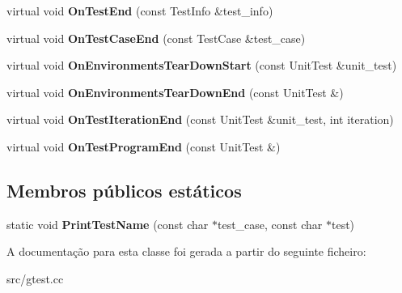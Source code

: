 \begin{DoxyCompactItemize}
\item 
\hypertarget{classtesting_1_1internal_1_1PrettyUnitTestResultPrinter_a06749ff2b32a16c127374ecd015f13e0}{virtual void {\bfseries On\-Test\-End} (const Test\-Info \&test\-\_\-info)}\label{classtesting_1_1internal_1_1PrettyUnitTestResultPrinter_a06749ff2b32a16c127374ecd015f13e0}

\item 
\hypertarget{classtesting_1_1internal_1_1PrettyUnitTestResultPrinter_a7a62fe58fa6f6aace813eb62b31e5a51}{virtual void {\bfseries On\-Test\-Case\-End} (const Test\-Case \&test\-\_\-case)}\label{classtesting_1_1internal_1_1PrettyUnitTestResultPrinter_a7a62fe58fa6f6aace813eb62b31e5a51}

\item 
\hypertarget{classtesting_1_1internal_1_1PrettyUnitTestResultPrinter_afea9dc849c92fdbc1d8505f4c74ffc1a}{virtual void {\bfseries On\-Environments\-Tear\-Down\-Start} (const Unit\-Test \&unit\-\_\-test)}\label{classtesting_1_1internal_1_1PrettyUnitTestResultPrinter_afea9dc849c92fdbc1d8505f4c74ffc1a}

\item 
\hypertarget{classtesting_1_1internal_1_1PrettyUnitTestResultPrinter_ab23094ef3b714778b2f742d39818c280}{virtual void {\bfseries On\-Environments\-Tear\-Down\-End} (const Unit\-Test \&)}\label{classtesting_1_1internal_1_1PrettyUnitTestResultPrinter_ab23094ef3b714778b2f742d39818c280}

\item 
\hypertarget{classtesting_1_1internal_1_1PrettyUnitTestResultPrinter_ac29b30216023baddda04ef5889f484ff}{virtual void {\bfseries On\-Test\-Iteration\-End} (const Unit\-Test \&unit\-\_\-test, int iteration)}\label{classtesting_1_1internal_1_1PrettyUnitTestResultPrinter_ac29b30216023baddda04ef5889f484ff}

\item 
\hypertarget{classtesting_1_1internal_1_1PrettyUnitTestResultPrinter_a8c92c062889abdb940b04ffe113f5980}{virtual void {\bfseries On\-Test\-Program\-End} (const Unit\-Test \&)}\label{classtesting_1_1internal_1_1PrettyUnitTestResultPrinter_a8c92c062889abdb940b04ffe113f5980}

\end{DoxyCompactItemize}
\subsection*{Membros públicos estáticos}
\begin{DoxyCompactItemize}
\item 
\hypertarget{classtesting_1_1internal_1_1PrettyUnitTestResultPrinter_a5b60a9aed1db02837b11450f6e8d0f71}{static void {\bfseries Print\-Test\-Name} (const char $\ast$test\-\_\-case, const char $\ast$test)}\label{classtesting_1_1internal_1_1PrettyUnitTestResultPrinter_a5b60a9aed1db02837b11450f6e8d0f71}

\end{DoxyCompactItemize}


A documentação para esta classe foi gerada a partir do seguinte ficheiro\-:\begin{DoxyCompactItemize}
\item 
src/gtest.\-cc\end{DoxyCompactItemize}
